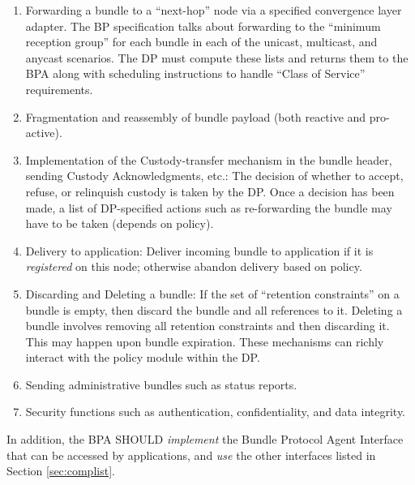 \documentclass[11pt]{article}
\begin{document}
\begin{enumerate}

\item Forwarding a bundle to a ``next-hop'' node via a specified convergence
layer adapter.  The BP specification talks about forwarding to the ``minimum
reception group'' for each bundle in each of the unicast, multicast, and
anycast scenarios. The DP must compute these lists and returns them to the BPA
along with scheduling instructions to handle ``Class of Service'' requirements.

\item Fragmentation and reassembly of bundle payload (both reactive and 
pro-active).

\item Implementation of the Custody-transfer mechanism in the bundle header,
sending Custody Acknowledgments, etc.: The decision of whether to accept,
refuse, or relinquish custody is taken by the DP. Once a decision has been
made, a list of DP-specified actions such as re-forwarding the bundle may have
to be taken (depends on policy).

\item Delivery to application: Deliver incoming bundle to application if it is
{\it registered} on this node; otherwise abandon delivery based on policy.

\item Discarding and Deleting a bundle: If the set of ``retention
constraints'' on a bundle is empty, then discard the bundle and all references
to it. Deleting a bundle involves removing all retention constraints and then
discarding it.  This may happen upon bundle expiration. These mechanisms can
richly interact with the policy module within the DP.

\item Sending administrative bundles such as status reports.

\item Security functions such as authentication, confidentiality, 
and data integrity.
\end{enumerate}

In addition, the BPA SHOULD {\it implement} the Bundle Protocol Agent Interface that
can be accessed by applications, and {\it use} the other interfaces listed in
Section \ref{sec:complist}.

\end{document}
